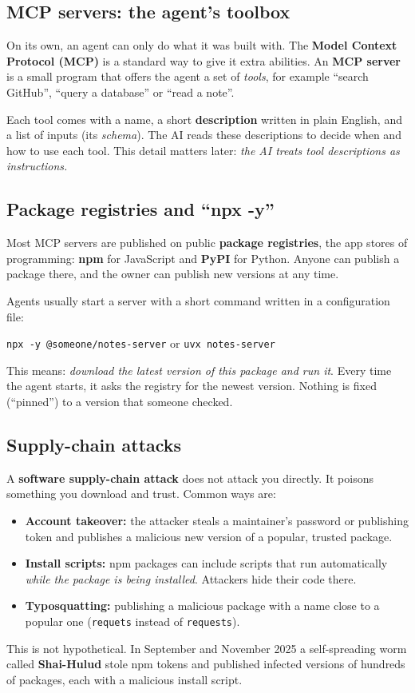 \documentclass[11pt,a4paper]{article}
\newcommand{\code}[1]{\texttt{#1}}
\begin{document}
\subsection{MCP servers: the agent's toolbox}
On its own, an agent can only do what it was built with. The \textbf{Model Context Protocol (MCP)} is a standard
way to give it extra abilities. An \textbf{MCP server} is a small program that offers the agent a set of
\emph{tools}, for example ``search GitHub'', ``query a database'' or ``read a note''.

Each tool comes with a name, a short \textbf{description} written in plain English, and a list of inputs (its
\emph{schema}). The AI reads these descriptions to decide when and how to use each tool. This detail matters
later: \emph{the AI treats tool descriptions as instructions.}

\subsection{Package registries and ``npx -y''}
Most MCP servers are published on public \textbf{package registries}, the app stores of programming:
\textbf{npm} for JavaScript and \textbf{PyPI} for Python. Anyone can publish a package there, and the owner can
publish new versions at any time.

Agents usually start a server with a short command written in a configuration file:
\begin{center}
\code{npx -y @someone/notes-server} \qquad or \qquad \code{uvx notes-server}
\end{center}
This means: \emph{download the latest version of this package and run it}. Every time the agent starts, it asks
the registry for the newest version. Nothing is fixed (``pinned'') to a version that someone checked.

\subsection{Supply-chain attacks}
A \textbf{software supply-chain attack} does not attack you directly. It poisons something you download and trust.
Common ways are:
\begin{itemize}
  \item \textbf{Account takeover:} the attacker steals a maintainer's password or publishing token and publishes a
        malicious new version of a popular, trusted package.
  \item \textbf{Install scripts:} npm packages can include scripts that run automatically \emph{while the package
        is being installed}. Attackers hide their code there.
  \item \textbf{Typosquatting:} publishing a malicious package with a name close to a popular one
        (\code{requets} instead of \code{requests}).
\end{itemize}
This is not hypothetical. In September and November 2025 a self-spreading worm called \textbf{Shai-Hulud} stole
npm tokens and published infected versions of hundreds of packages, each with a malicious install script.
\end{document}
